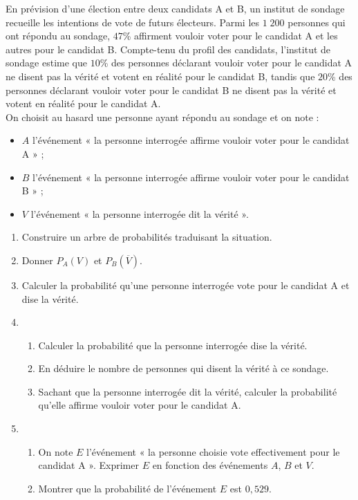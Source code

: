 \documentclass[11pt]{article}
\begin{document}
\begin{exo}
En prévision d’une élection entre deux candidats A et B, un institut de
sondage recueille les intentions de vote de futurs électeurs. Parmi les $1\;200$
personnes qui ont répondu au sondage, $47$\% affirment vouloir voter pour le
candidat A et les autres pour le candidat B.
Compte-tenu du profil des candidats, l’institut de sondage estime que $10$\% des personnes déclarant
vouloir voter pour le candidat A ne disent pas la vérité et votent en réalité
pour le candidat B, tandis que $20$\% des personnes déclarant vouloir voter
pour le candidat B ne disent pas la vérité et votent en réalité
pour le candidat A.\\[5mm]
On choisit au hasard une personne ayant répondu au sondage et on note :
\begin{itemize}
  \item $A$ l'événement « la personne interrogée affirme vouloir voter pour le
    candidat A » ;
  \item $B$ l'événement « la personne interrogée affirme vouloir voter pour le
    candidat B » ;
  \item $V$ l'événement « la personne interrogée dit la vérité ».
\end{itemize}
\begin{enumerate}
  \item Construire un arbre de probabilités traduisant la situation.
  \item Donner $P_A(V)$ et $P_B(\overline V)$.
  \item Calculer la probabilité qu'une personne interrogée vote pour le candidat
    A et dise la vérité.
  \item \begin{enumerate}
      \item Calculer la probabilité que la personne interrogée dise la vérité.
      \item En déduire le nombre de personnes qui disent la vérité à ce sondage.
      \item Sachant que la personne interrogée dit la vérité, calculer la
        probabilité qu'elle affirme vouloir voter pour le candidat A.
    \end{enumerate}
  \item \begin{enumerate}
      \item On note $E$ l'événement « la personne choisie vote effectivement
        pour le candidat A ». Exprimer $E$ en fonction des événements $A$, $B$
        et $V$.
      \item Montrer que la probabilité de l'événement $E$ est $0,529$.
    \end{enumerate}
\end{enumerate}
\end{exo}
\end{document}
